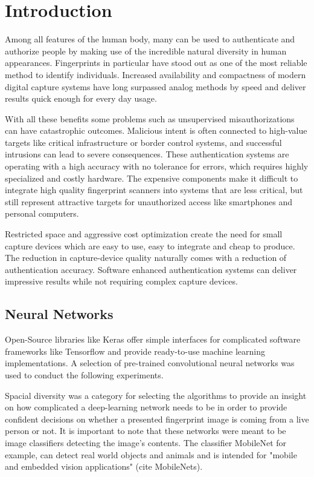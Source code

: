 \section{Introduction}
Among all features of the human body, many can be used to authenticate and authorize people by making use of the incredible natural diversity in human appearances. 
Fingerprints in particular have stood out as one of the most reliable method to identify individuals.
Increased availability and compactness of modern digital capture systems have long surpassed analog methods by speed and deliver results quick enough for every day usage.

With all these benefits some problems such as unsupervised misauthorizations can have catastrophic outcomes.
Malicious intent is often connected to high-value targets like critical infrastructure or border control systems, and successful intrusions can lead to severe consequences.
These authentication systems are operating with a high accuracy with no tolerance for errors, which requires highly specialized and costly hardware.
The expensive components make it difficult to integrate high quality fingerprint scanners into systems that are less critical, but still represent attractive targets for unauthorized access like smartphones and personal computers.

Restricted space and aggressive cost optimization create the need for small capture devices which are easy to use, easy to integrate and cheap to produce. 
The reduction in capture-device quality naturally comes with a reduction of authentication accuracy.
Software enhanced authentication systems can deliver impressive results while not requiring complex capture devices.



\subsection{Neural Networks}
Open-Source libraries like Keras offer simple interfaces for complicated software frameworks like Tensorflow and provide ready-to-use machine learning implementations.
A selection of pre-trained convolutional neural networks was used to conduct the following experiments.

Spacial diversity was a category for selecting the algorithms to provide an insight on how complicated a deep-learning network needs to be in order to provide confident decisions on whether a presented fingerprint image is coming from a live person or not.
It is important to note that these networks were meant to be image classifiers detecting the image's contents.
The classifier MobileNet for example, can detect real world objects and animals and is intended for "mobile and embedded vision applications" (cite MobileNets).


